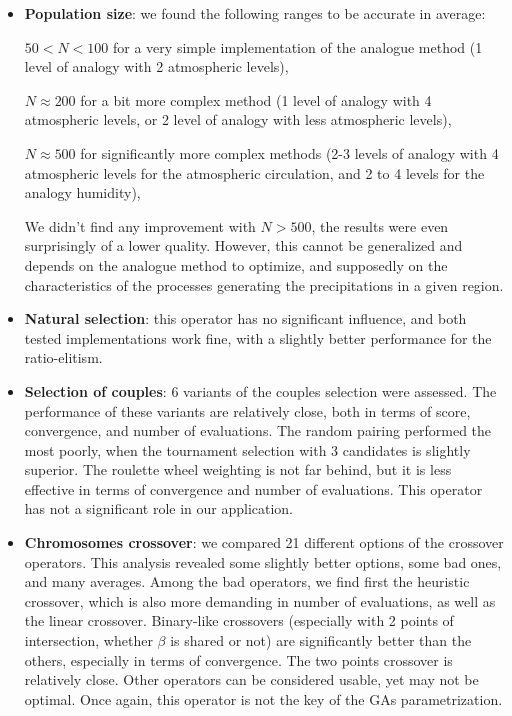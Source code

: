 \documentclass[twocol]{ametsoc}
\begin{document}
\begin{itemize}
	\item \textbf{Population size}: we found the following ranges to be accurate in average:

	$50<N<100$ for a very simple implementation of the analogue method (1 level of analogy with 2 atmospheric levels),
		
	$N\approx200$ for a bit more complex method (1 level of analogy with 4 atmospheric levels, or 2 level of analogy with less atmospheric levels),
		
	$N\approx500$ for significantly more complex methods (2-3 levels of analogy with 4 atmospheric levels for the atmospheric circulation, and 2 to 4 levels for the analogy humidity),

	We didn't find any improvement with $N>500$, the results were even surprisingly of a lower quality. However, this cannot be generalized and depends on the analogue method to optimize, and supposedly on the characteristics of the processes generating the precipitations in a given region. 
	
	\item \textbf{Natural selection}: this operator has no significant influence, and both tested implementations work fine, with a slightly better performance for the ratio-elitism.
	
	\item \textbf{Selection of couples}: 6 variants of the couples selection were assessed. The performance of these variants are relatively close, both in terms of score, convergence, and number of evaluations. The random pairing performed the most poorly, when the tournament selection with 3 candidates is slightly superior. The roulette wheel weighting is not far behind, but it is less effective in terms of convergence and number of evaluations. This operator has not a significant role in our application. 
	
	\item \textbf{Chromosomes crossover}: we compared 21 different options of the crossover operators. This analysis revealed some slightly better options, some bad ones, and many averages. Among the bad operators, we find first the heuristic crossover, which is also more demanding in number of evaluations, as well as the linear crossover. Binary-like crossovers (especially with 2 points of intersection, whether $\beta$ is shared or not) are significantly better than the others, especially in terms of convergence. The two points crossover is relatively close. Other operators can be considered usable, yet may not be optimal. Once again, this operator is not the key of the GAs parametrization.
	

\end{itemize}
\end{document}
